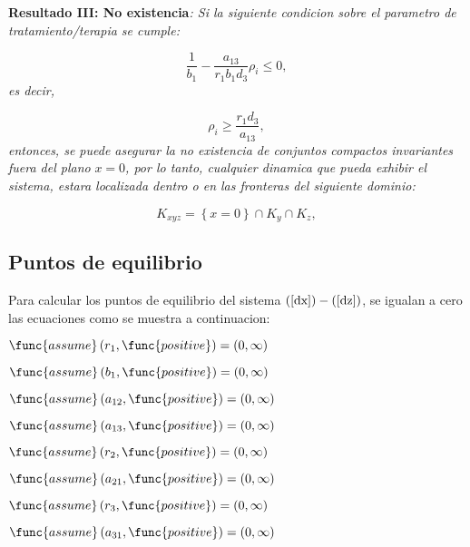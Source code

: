 \documentclass[letterpaper,11pt]{article}
\begin{document}
\bigskip 

\textbf{Resultado III: No existencia}\textit{: Si la siguiente condicion
sobre el parametro de tratamiento/terapia se cumple:}

\begin{equation*}
\frac{1}{b_{1}}-\frac{a_{13}}{r_{1}b_{1}d_{3}}\rho _{i}\leq 0,
\end{equation*}%
\textit{es decir,}

\bigskip 
\begin{equation*}
\rho _{i}\geq \frac{r_{1}d_{3}}{a_{13}},
\end{equation*}%
\textit{entonces, se puede asegurar la no existencia de conjuntos compactos
invariantes fuera del plano }$x=0$\textit{, por lo tanto, cualquier dinamica
que pueda exhibir el sistema, estara localizada dentro o en las fronteras
del siguiente dominio:}

\begin{equation*}
K_{xyz}=\left\{ x=0\right\} \cap K_{y}\cap K_{z},
\end{equation*}

\subsection{Puntos de equilibrio}

Para calcular los puntos de equilibrio del sistema $\left( \ref{dx}\right)
-\left( \ref{dz}\right) $, se igualan a cero las ecuaciones como se muestra
a continuacion:

$\func{assume}\left( r_{1},\func{positive}\right) =\allowbreak \left(
0,\infty \right) $

$\func{assume}\left( b_{1},\func{positive}\right) =\allowbreak \left(
0,\infty \right) $

$\func{assume}\left( a_{12},\func{positive}\right) =\allowbreak \left(
0,\infty \right) $

$\func{assume}\left( a_{13},\func{positive}\right) =\allowbreak \left(
0,\infty \right) $

$\func{assume}\left( r_{2},\func{positive}\right) =\allowbreak \left(
0,\infty \right) $

$\func{assume}\left( a_{21},\func{positive}\right) =\allowbreak \left(
0,\infty \right) $

$\func{assume}\left( r_{3},\func{positive}\right) =\allowbreak \left(
0,\infty \right) $

$\func{assume}\left( a_{31},\func{positive}\right) =\allowbreak \left(
0,\infty \right) $
\end{document}
